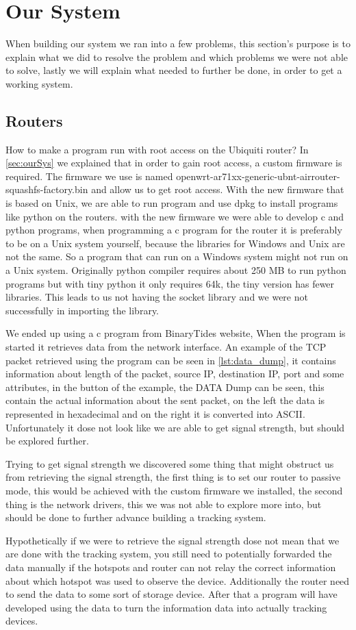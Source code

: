 \section{Our System}
When building our system we ran into a few problems, this section's purpose is to explain what we did to resolve the problem and which problems we were not able to solve, lastly we will explain what needed to further be done, in order to get a working system.

\subsection*{Routers}
How to make a program run with root access on the Ubiquiti router? In \cref{sec:ourSys} we explained that in order to gain root access, a custom firmware is required. The firmware we use is named openwrt-ar71xx-generic-ubnt-airrouter-squashfs-factory.bin and allow us to get root access. With the new firmware that is based on Unix, we are able to run program and use dpkg to install programs like python on the routers. with the new firmware we were able to develop c and python programs, when programming a c program for the router it is preferably to be on a Unix system yourself, because the libraries for Windows and Unix are not the same. So a program that can run on a Windows system might not run on a Unix system. Originally python compiler requires about 250 MB to run python programs but with tiny python it only requires 64k, the tiny version has fewer libraries. This leads to us not having the socket library and we were not successfully in importing the library.

We ended up using a c program from BinaryTides website\cite{SnifferCode}, When the program is started it retrieves data from the network interface. An example of the TCP packet retrieved using the program can be seen in \cref{lst:data_dump}, it contains information about length of the packet, source IP, destination IP, port and some attributes, in the button of the example, the DATA Dump can be seen, this contain the actual information about the sent packet, on the left the data is represented in hexadecimal and on the right it is converted into ASCII. Unfortunately it dose not look like we are able to get signal strength, but should be explored further.

Trying to get signal strength we discovered some thing that might obstruct us from retrieving the signal strength, the first thing is to set our router to passive mode, this would be achieved with the custom firmware we installed, the second thing is the network drivers, this we was not able to explore more into, but should be done to further advance building a tracking system.

Hypothetically if we were to retrieve the signal strength dose not mean that we are done with the tracking system, you still need to potentially forwarded the data manually if the hotspots and router can not relay the correct information about which hotspot was used to observe the device. Additionally the router need to send the data to some sort of storage device. After that a program will have developed using the data to turn the information data into actually tracking devices.
